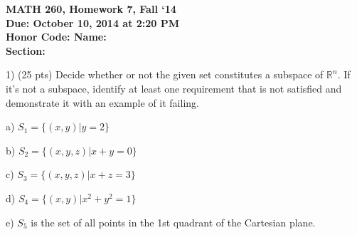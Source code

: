 \documentclass{article}
\begin{document}
\begin{flushleft}
	\bfseries{MATH 260, Homework 7, Fall `14}\\
	\bfseries{Due: October 10, 2014 at 2:20 PM}\\
	\bfseries{Honor Code:} \hspace{3.5in}\bfseries{Name:}\\
	\hspace{4.37in}\bfseries{Section:}
\end{flushleft}
\begin{flushleft}
\vspace{.25in}

1) (25 pts) Decide whether or not the given set constitutes a subspace of $\mathbb{R}^n$.  If it's not a subspace, identify at least one requirement that is not satisfied and demonstrate it with an example of it failing.

\vspace{0.2in}

a) $S_1 = \{(x,y)| y = 2\}$

\vspace{2.5in}

b) $S_2 = \{(x,y,z)| x + y = 0\}$

\vspace{2.5in}

c) $S_3 = \{(x,y,z)| x + z = 3\}$

\pagebreak

d) $S_4 = \{(x,y)| x^2 + y^2 = 1\}$

\vspace{2.5in}

e) $S_5$ is the set of all points in the 1st quadrant of the Cartesian plane.


\end{flushleft}
\end{document}
